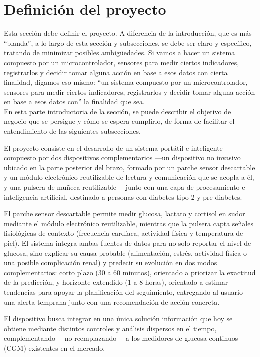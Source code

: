 \section{Definición del proyecto}
{\consigna
Esta sección debe definir el proyecto. A diferencia de la introducción, que es más ``blanda'', a lo largo de esta sección y subsecciones, se debe ser claro y específico, tratando de minimizar posibles ambigüedades.
Si vamos a hacer un sistema compuesto por un microcontrolador, sensores para medir ciertos indicadores, registrarlos y decidir tomar alguna acción en base a esos datos con cierta finalidad, digamos eso mismo: ``un sistema compuesto por un microcontrolador, sensores para medir ciertos indicadores, registrarlos y decidir tomar alguna acción en base a esos datos con'' la finalidad que sea.\\


En esta parte introductoria de la sección, se puede describir el objetivo de negocio que se persigue y cómo se espera cumplirlo, de forma de facilitar el entendimiento de las siguientes subsecciones.
}

El proyecto consiste en el desarrollo de un sistema portátil e inteligente compuesto por dos dispositivos complementarios —un dispositivo no invasivo ubicado en la parte posterior del brazo, formado por un parche sensor descartable y un módulo electrónico reutilizable de lectura y comunicación que se acopla a él, y una pulsera de muñeca reutilizable— junto con una capa de procesamiento e inteligencia artificial, destinado a personas con diabetes tipo 2 y pre-diabetes.

El parche sensor descartable permite medir glucosa, lactato y cortisol en sudor mediante el módulo electrónico reutilizable, mientras que la pulsera capta señales fisiológicas de contexto (frecuencia cardíaca, actividad física y temperatura de piel). El sistema integra ambas fuentes de datos para no solo reportar el nivel de glucosa, sino explicar su causa probable (alimentación, estrés, actividad física o una posible complicación renal) y predecir su evolución en dos modos complementarios: corto plazo (30 a 60 minutos), orientado a priorizar la exactitud de la predicción, y horizonte extendido (1 a 8 horas), orientado a estimar tendencias para apoyar la planificación del seguimiento, entregando al usuario una alerta temprana junto con una recomendación de acción concreta.

El dispositivo busca integrar en una única solución información que hoy se obtiene mediante distintos controles y análisis dispersos en el tiempo, complementando —no reemplazando— a los medidores de glucosa continuos (CGM) existentes en el mercado.


